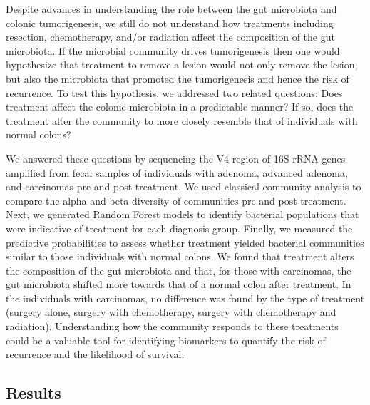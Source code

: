 \documentclass[12pt,]{article}
\begin{document}
Despite advances in understanding the role between the gut microbiota
and colonic tumorigenesis, we still do not understand how treatments
including resection, chemotherapy, and/or radiation affect the
composition of the gut microbiota. If the microbial community drives
tumorigenesis then one would hypothesize that treatment to remove a
lesion would not only remove the lesion, but also the microbiota that
promoted the tumorigenesis and hence the risk of recurrence. To test
this hypothesis, we addressed two related questions: Does treatment
affect the colonic microbiota in a predictable manner? If so, does the
treatment alter the community to more closely resemble that of
individuals with normal colons?

We answered these questions by sequencing the V4 region of 16S rRNA
genes amplified from fecal samples of individuals with adenoma, advanced
adenoma, and carcinomas pre and post-treatment. We used classical
community analysis to compare the alpha and beta-diversity of
communities pre and post-treatment. Next, we generated Random Forest
models to identify bacterial populations that were indicative of
treatment for each diagnosis group. Finally, we measured the predictive
probabilities to assess whether treatment yielded bacterial communities
similar to those individuals with normal colons. We found that treatment
alters the composition of the gut microbiota and that, for those with
carcinomas, the gut microbiota shifted more towards that of a normal
colon after treatment. In the individuals with carcinomas, no difference
was found by the type of treatment (surgery alone, surgery with
chemotherapy, surgery with chemotherapy and radiation). Understanding
how the community responds to these treatments could be a valuable tool
for identifying biomarkers to quantify the risk of recurrence and the
likelihood of survival.

\newpage

\subsection{Results}\label{results}
\end{document}
